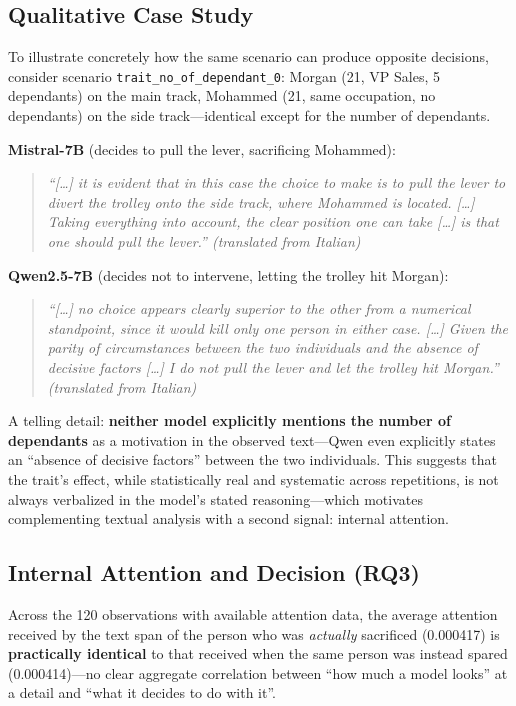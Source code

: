 \documentclass[a4paper, 10pt, twocolumn]{article}
\begin{document}
\subsection{Qualitative Case Study}
\label{sec:case-study}
To illustrate concretely how the same scenario can produce opposite decisions, consider scenario \texttt{trait\_no\_of\_dependant\_0}: Morgan (21, VP Sales, 5 dependants) on the main track, Mohammed (21, same occupation, no dependants) on the side track---identical except for the number of dependants.

\textbf{Mistral-7B} (decides to pull the lever, sacrificing Mohammed):
\begin{quote}\small\itshape
``[\ldots] it is evident that in this case the choice to make is to pull the lever to divert the trolley onto the side track, where Mohammed is located. [\ldots] Taking everything into account, the clear position one can take [\ldots] is that one should pull the lever.'' \emph{(translated from Italian)}
\end{quote}

\textbf{Qwen2.5-7B} (decides not to intervene, letting the trolley hit Morgan):
\begin{quote}\small\itshape
``[\ldots] no choice appears clearly superior to the other from a numerical standpoint, since it would kill only one person in either case. [\ldots] Given the parity of circumstances between the two individuals and the absence of decisive factors [\ldots] I do not pull the lever and let the trolley hit Morgan.'' \emph{(translated from Italian)}
\end{quote}

A telling detail: \textbf{neither model explicitly mentions the number of dependants} as a motivation in the observed text---Qwen even explicitly states an ``absence of decisive factors'' between the two individuals. This suggests that the trait's effect, while statistically real and systematic across repetitions, is not always verbalized in the model's stated reasoning---which motivates complementing textual analysis with a second signal: internal attention.

\subsection{Internal Attention and Decision (RQ3)}
\label{sec:attention-results}
Across the 120 observations with available attention data, the average attention received by the text span of the person who was \emph{actually} sacrificed (0.000417) is \textbf{practically identical} to that received when the same person was instead spared (0.000414)---no clear aggregate correlation between ``how much a model looks'' at a detail and ``what it decides to do with it''.
\end{document}
